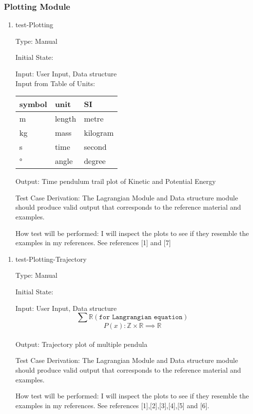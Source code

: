 \documentclass[12pt, titlepage]{article}
\begin{document}
\subsubsection{Plotting Module} 

\begin{enumerate}				
	\item{test-Plotting\\}
	
	Type: Manual
	
	Initial State: 
	
	Input: User Input, Data structure\\
	Input from Table of Units:\\
  \noindent \begin{tabular}{l l l} 
    \toprule		
    \textbf{symbol} & \textbf{unit} & \textbf{SI}\\
    \midrule 
    \si{\metre} & length & metre\\
    \si{\kilogram} & mass & kilogram\\
    \si{\second} & time & second\\
    \si{\degree} & angle & degree\\
    \bottomrule
  \end{tabular}
	
	Output: Time pendulum trail plot of Kinetic and Potential Energy
	
	Test Case Derivation: The Lagrangian Module and Data structure module should produce valid
	output that corresponds to the reference material and examples.
	
	How test will be performed: I will inspect the plots to see if 
	they resemble the examples in my references. See
        references [1] and [7]
\end{enumerate} 

\begin{enumerate}				
	\item{test-Plotting-Trajectory\\}
	
	Type: Manual
	
	Initial State: 
	
	Input: User Input, Data structure
$$\sum \mathbb{R} (\texttt{for Langrangian equation})$$
$$ P(x) :\mathbb{Z} \times \mathbb{R} \implies \mathbb{R}$$\\
	
	Output: Trajectory plot of multiple pendula
	
	Test Case Derivation: The Lagrangian Module and Data structure module should produce valid
	output that corresponds to the reference material and examples.
	
	How test will be performed: I will inspect the plots to see if 
	they resemble the examples in my references. See references [1],[2],[3],[4],[5] and [6].
\end{enumerate}
\end{document}
